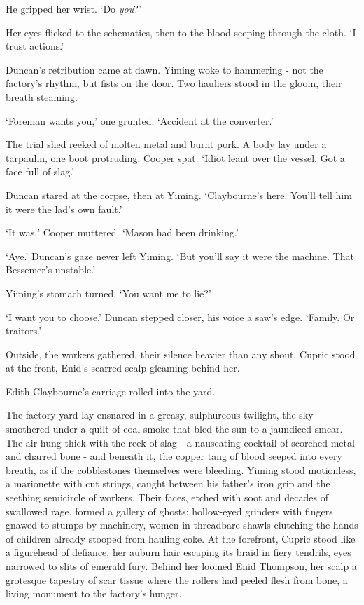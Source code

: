 He gripped her wrist. `Do \textit{you}?'

Her eyes flicked to the schematics, then to the blood seeping through the cloth. `I trust actions.'

Duncan's retribution came at dawn. Yiming woke to hammering - not the factory's rhythm, but fists on the door. Two hauliers stood in the gloom, their breath steaming.

`Foreman wants you,' one grunted. `Accident at the converter.'

The trial shed reeked of molten metal and burnt pork. A body lay under a tarpaulin, one boot protruding. Cooper spat. `Idiot leant over the vessel. Got a face full of slag.'

Duncan stared at the corpse, then at Yiming. `Claybourne's here. You'll tell him it were the lad's own fault.'

`It was,' Cooper muttered. `Mason had been drinking.'

`Aye.' Duncan's gaze never left Yiming. `But you'll say it were the machine. That Bessemer's unstable.'

Yiming's stomach turned. `You want me to lie?'

`I want you to choose.' Duncan stepped closer, his voice a saw's edge. `Family. Or traitors.'

Outside, the workers gathered, their silence heavier than any shout. Cupric stood at the front, Enid's scarred scalp gleaming behind her.

Edith Claybourne's carriage rolled into the yard.

The factory yard lay ensnared in a greasy, sulphureous twilight, the sky smothered under a quilt of coal smoke that bled the sun to a jaundiced smear. The air hung thick with the reek of slag - a nauseating cocktail of scorched metal and charred bone - and beneath it, the copper tang of blood seeped into every breath, as if the cobblestones themselves were bleeding. Yiming stood motionless, a marionette with cut strings, caught between his father's iron grip and the seething semicircle of workers. Their faces, etched with soot and decades of swallowed rage, formed a gallery of ghosts: hollow-eyed grinders with fingers gnawed to stumps by machinery, women in threadbare shawls clutching the hands of children already stooped from hauling coke. At the forefront, Cupric stood like a figurehead of defiance, her auburn hair escaping its braid in fiery tendrils, eyes narrowed to slits of emerald fury. Behind her loomed Enid Thompson, her scalp a grotesque tapestry of scar tissue where the rollers had peeled flesh from bone, a living monument to the factory's hunger.

